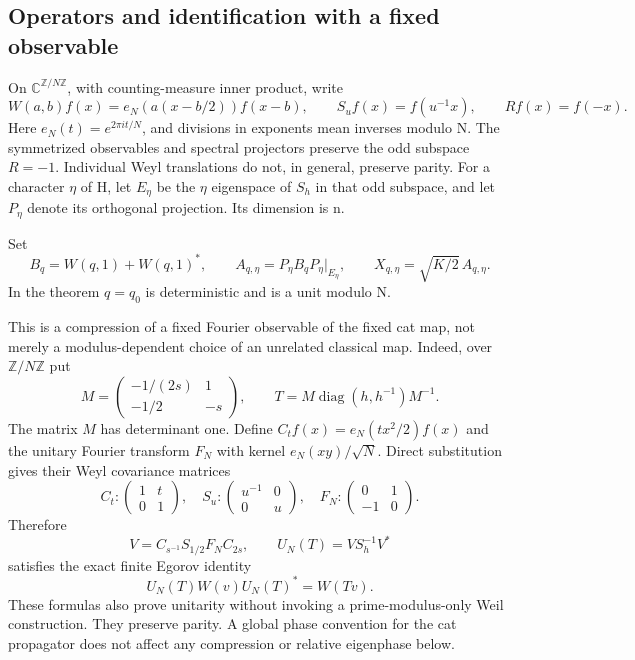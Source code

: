 \subsection{Operators and identification with a fixed observable}\label{pell_blocks:operators-and-identification-with-a-fixed-observable}

On \(\mathbb C^{\mathbb Z/N\mathbb Z}\), with counting-measure inner product, write \[
 W(a,b)f(x)=e_N(a(x-b/2))f(x-b),\qquad
 S_u f(x)=f(u^{-1}x),\qquad Rf(x)=f(-x).
\] Here \(e_N(t)=e^{2\pi it/N}\), and divisions in exponents mean inverses modulo N. The symmetrized observables and spectral projectors preserve the odd subspace \(R=-1\). Individual Weyl translations do not, in general, preserve parity. For a character \(\eta\) of H, let \(E_{\eta}\) be the \(\eta\) eigenspace of \(S_{h}\) in that odd subspace, and let \(P_{\eta}\) denote its orthogonal projection. Its dimension is n.

Set \[
 B_q=W(q,1)+W(q,1)^*,\qquad
 A_{q,\eta}=P_\eta B_qP_\eta|_{E_\eta},\qquad
 X_{q,\eta}=\sqrt{K/2}\,A_{q,\eta}. \tag{PB.2}
\] In the theorem \(q=q_0\) is deterministic and is a unit modulo N.

This is a compression of a fixed Fourier observable of the fixed cat map, not merely a modulus-dependent choice of an unrelated classical map. Indeed, over \(\mathbb Z/N\mathbb Z\) put \[
 M=\begin{pmatrix}-1/(2s)&1\\-1/2&-s\end{pmatrix},\qquad
 T=M\operatorname{diag}(h,h^{-1})M^{-1}. \tag{PB.3}
\] The matrix \(M\) has determinant one. Define \(C_tf(x)=e_N(tx^2/2)f(x)\) and the unitary Fourier transform \(F_N\) with kernel \(e_N(xy)/\sqrt N\). Direct substitution gives their Weyl covariance matrices \[
 C_t:\begin{pmatrix}1&t\\0&1\end{pmatrix},\quad
 S_u:\begin{pmatrix}u^{-1}&0\\0&u\end{pmatrix},\quad
 F_N:\begin{pmatrix}0&1\\-1&0\end{pmatrix}.
\] Therefore \[
 V=C_{s^{-1}}S_{1/2}F_NC_{2s},\qquad U_N(T)=VS_h^{-1}V^* \tag{PB.4}
\] satisfies the exact finite Egorov identity \[
 U_N(T)W(v)U_N(T)^*=W(Tv).
\] These formulas also prove unitarity without invoking a prime-modulus-only Weil construction. They preserve parity. A global phase convention for the cat propagator does not affect any compression or relative eigenphase below.

